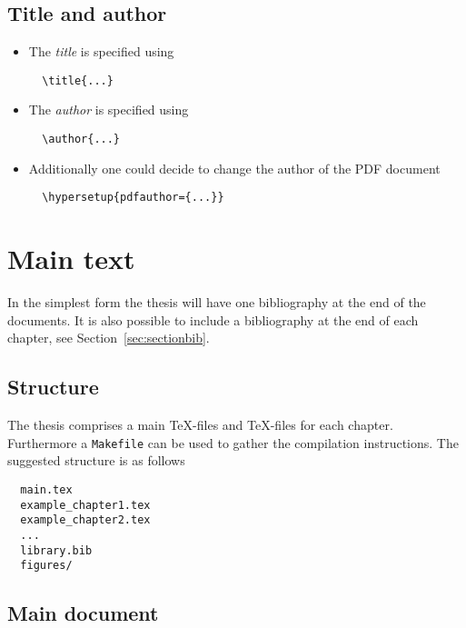 \subsection{Title and author}

%
\begin{itemize}
%
\item The \textit{title} is specified using
\begin{verbatim}
  \title{...}
\end{verbatim}
%
\item The \textit{author} is specified using
\begin{verbatim}
  \author{...}
\end{verbatim}
%
\item Additionally one could decide to change the author of the PDF document
\begin{verbatim}
  \hypersetup{pdfauthor={...}}
\end{verbatim}
%
\end{itemize}
%

\section{Main text}

In the simplest form the thesis will have one bibliography at the end of the documents. It is also possible to include a bibliography at the end of each chapter, see Section~\ref{sec:sectionbib}.

\subsection{Structure}

The thesis comprises a main \TeX-files and \TeX-files for each chapter. Furthermore a \texttt{Makefile} can be used to gather the compilation instructions. The suggested structure is as follows
%
\begin{verbatim}
  main.tex
  example_chapter1.tex
  example_chapter2.tex
  ...
  library.bib
  figures/
\end{verbatim}
%

\subsection{Main document}

